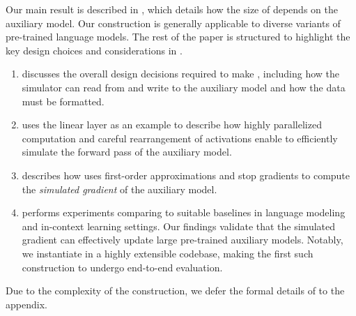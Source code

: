 
Our main result is described in , which details how the size of \simulator{} depends on the auxiliary model. Our construction is generally applicable to diverse variants of pre-trained language models.
The rest of the paper is structured to highlight the key design choices and considerations in \simulator{}. 
\begin{enumerate}[leftmargin=*]
    \item {} discusses the overall design decisions required to make \simulator{}, including how the simulator can read from and write to the auxiliary model and how the data must be formatted.
    \item {} uses the linear layer as an example to describe how highly parallelized computation and careful rearrangement of activations enable \simulator{} to efficiently simulate the forward pass of the auxiliary model.
    \item {} describes how \simulator{} uses first-order approximations and stop gradients to compute the \emph{simulated gradient} of the auxiliary model. 
    \item {} performs experiments comparing \simulator{} to suitable baselines in language modeling and in-context learning settings. Our findings validate that the simulated gradient can effectively update large pre-trained auxiliary models. Notably, we instantiate \simulator{} in a highly extensible codebase, making \simulator{} the first such construction to undergo end-to-end evaluation.
\end{enumerate}

Due to the complexity of the construction, we defer the formal details of \simulator{} to the appendix.

